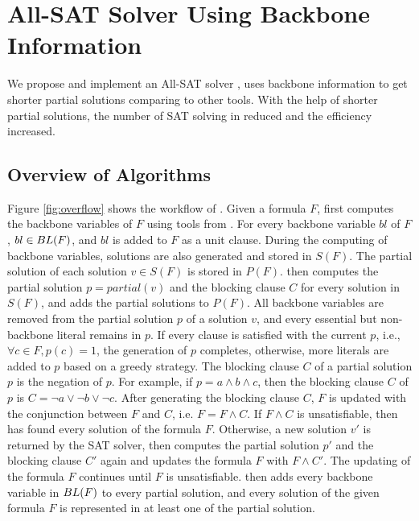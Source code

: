 \section{All-SAT Solver Using Backbone Information} \label{sec:meth}
We propose and implement an All-SAT solver \tool, \tool uses backbone information to get shorter partial solutions comparing to other tools.
With the help of shorter partial solutions, the number of SAT solving in \tool reduced and the efficiency increased.

\subsection{Overview of Algorithms}
Figure \ref{fig:overflow} shows the workflow of \tool.
Given a formula $F$, \tool first computes the backbone variables of $F$ using tools from \cite{bb}.
For every backbone variable $bl$ of $F$, $bl\in {\sc BL}(F)$, and $bl$ is added to $F$ as a unit clause. During the computing of backbone variables, solutions are also generated and stored in $S(F)$. The partial solution of each solution $v\in S(F)$ is stored in $P(F)$.
\tool then computes the partial solution $p=partial(v)$ and the blocking clause $C$ for every solution in $S(F)$, and adds the partial solutions to $P(F)$. 
All backbone variables are removed from the partial solution $p$ of a solution $v$, and every essential but non-backbone literal remains in $p$. If every clause is satisfied with the current $p$, i.e., $\forall c\in F, p(c)=1$, the generation of $p$ completes, otherwise, more literals are added to $p$ based on a greedy strategy.
The blocking clause $C$ of a partial solution $p$ is the negation of $p$. For example, if $p=a\wedge b \wedge c$, then the blocking clause $C$ of $p$ is $C=\neg a \vee \neg b \vee \neg c$.
After generating the blocking clause $C$, $F$ is updated with the conjunction between $F$ and $C$, i.e. $F=F\wedge C$.
If $F\wedge C$ is unsatisfiable, then \tool has found every solution of the formula $F$.
Otherwise, a new solution $v'$ is returned by the SAT solver, \tool then computes the partial solution $p'$ and the blocking clause $C'$ again and updates the formula $F$ with $F\wedge C'$.
The updating of the formula $F$ continues until $F$ is unsatisfiable.
\tool then adds every backbone variable in ${\sc BL}(F)$ to every partial solution, and every solution of the given formula $F$ is represented in at least one of the partial solution.


